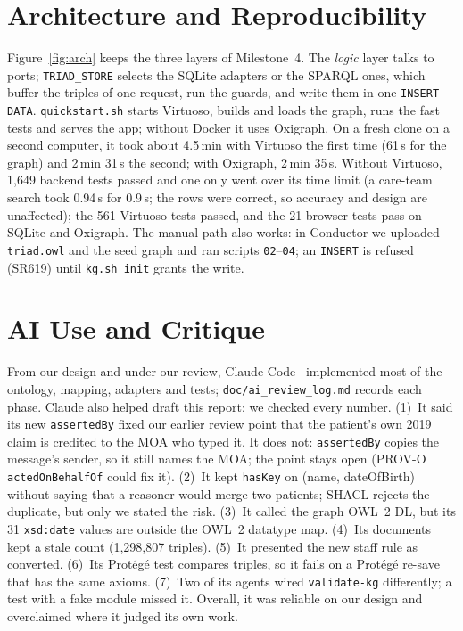\documentclass[sigconf]{acmart}
\newcommand{\tw}[1]{\texttt{#1}}
\begin{document}
\section{Architecture and Reproducibility}\label{sec:arch}
Figure~\ref{fig:arch} keeps the three layers of Milestone~4. The \emph{logic} layer talks to ports; \tw{TRIAD\_STORE} selects the SQLite adapters or the SPARQL ones, which buffer the triples of one request, run the guards, and write them in one \tw{INSERT DATA}. \tw{quickstart.sh} starts Virtuoso, builds and loads the graph, runs the fast tests and serves the app; without Docker it uses Oxigraph. On a fresh clone on a second computer, it took about 4.5\,min with Virtuoso the first time (61\,s for the graph) and 2\,min 31\,s the second; with Oxigraph, 2\,min 35\,s. Without Virtuoso, 1,649 backend tests passed and one only went over its time limit (a care-team search took 0.94\,s for 0.9\,s; the rows were correct, so accuracy and design are unaffected); the 561 Virtuoso tests passed, and the 21 browser tests pass on SQLite and Oxigraph. The manual path also works: in Conductor we uploaded \tw{triad.owl} and the seed graph and ran scripts \tw{02}--\tw{04}; an \tw{INSERT} is refused (SR619) until \tw{kg.sh init} grants the write.

\section{AI Use and Critique}\label{sec:ai}
From our design and under our review, Claude Code~\cite{claudecode} implemented most of the ontology, mapping, adapters and tests; \tw{doc/ai\_review\_log.md} records each phase. Claude also helped draft this report; we checked every number. (1)~It said its new \tw{assertedBy} fixed our earlier review point that the patient's own 2019 claim is credited to the MOA who typed it. It does not: \tw{assertedBy} copies the message's sender, so it still names the MOA; the point stays open (PROV-O \tw{actedOnBehalfOf} could fix it). (2)~It kept \tw{hasKey} on (name, dateOfBirth) without saying that a reasoner would merge two patients; SHACL rejects the duplicate, but only we stated the risk. (3)~It called the graph OWL~2 DL, but its 31 \tw{xsd:date} values are outside the OWL~2 datatype map. (4)~Its documents kept a stale count (1,298,807 triples). (5)~It presented the new staff rule as converted. (6)~Its Protégé test compares triples, so it fails on a Protégé re-save that has the same axioms. (7)~Two of its agents wired \tw{validate-kg} differently; a test with a fake module missed it. Overall, it was reliable on our design and overclaimed where it judged its own work.
\end{document}
